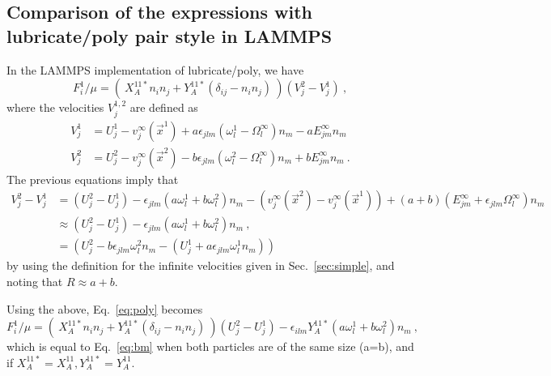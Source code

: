 \documentclass[reprint, amsmath,amssymb,aps,pre,onecolumn,notitlepage%
]{revtex4-1}
\begin{document}
\subsection{Comparison of the expressions with lubricate/poly pair style in LAMMPS}
In the LAMMPS implementation of lubricate/poly, we have
\begin{equation}
	F^1_i/\mu= (\ X_A^{11*}n_in_j+Y_A^{11*}(\delta_{ij}-n_in_j)\ )(V^2_j-V^1_j)\ ,
	\label{eq:poly}
\end{equation}
where the velocities $V^{1,2}_j$ are defined as
\begin{align}
	V^1_j&=U^1_j-v_j^\infty(\vec{x}^1)+a\epsilon_{jlm}(\omega_l^1-\Omega_l^\infty)n_m-a E^\infty_{jm}n_m\\
	V^2_j&=U^2_j-v_j^\infty(\vec{x}^2)-b\epsilon_{jlm}(\omega_l^2-\Omega_l^\infty)n_m+b E^\infty_{jm}n_m\ .
\end{align}
The previous equations imply that
\begin{equation}
\begin{split}	
V^2_j-V^1_j&=(U^2_j-U^1_j)-\epsilon_{jlm}(a\omega_l^1+b\omega_l^2)n_m-(v_j^\infty(\vec{x}^2)-v_j^\infty(\vec{x}^1))+(a+b) (E^\infty_{jm}+\epsilon_{jlm}\Omega^\infty_l)n_m\\
&\approx (U^2_j-U^1_j)-\epsilon_{jlm}(a\omega_l^1+b\omega_l^2)n_m\ ,\\
&=\left(U^2_j-b\epsilon_{jlm}\omega_l^2n_m-(U^1_j+a\epsilon_{jlm}\omega_l^1n_m)\right)
\end{split}
\end{equation}
by using the definition for the infinite velocities given in Sec.~\ref{sec:simple}, and noting that $R\approx a+b$. 

Using the above, Eq.~\eqref{eq:poly} becomes
\begin{equation}
	F^1_i/\mu= (\ X_A^{11*}n_in_j+Y_A^{11*}(\delta_{ij}-n_in_j)\ )(U^2_j-U^1_j)-\epsilon_{ilm}Y_A^{11*}(a\omega_l^1+b\omega_l^2)n_m\ ,
	\label{eq:polyfinal}
\end{equation}
which is equal to Eq.~\eqref{eq:bm} when both particles are of the same size (a=b), and if $X_A^{11*}=X_A^{11},Y_A^{11*}=Y_A^{11}$.
\end{document}
